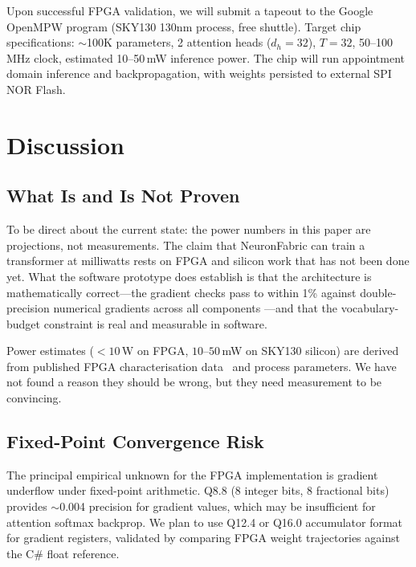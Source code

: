 \documentclass[11pt]{article}
\begin{document}
Upon successful FPGA validation, we will submit a tapeout to the Google OpenMPW
program (SKY130 130nm process, free shuttle). Target chip specifications:
$\sim$100K parameters, 2 attention heads ($d_h=32$), $T=32$, 50--100\,MHz clock,
estimated 10--50\,mW inference power. The chip will run appointment domain inference
and backpropagation, with weights persisted to external SPI NOR Flash.

\section{Discussion}

\subsection{What Is and Is Not Proven}

To be direct about the current state: the power numbers in this paper are projections,
not measurements. The claim that NeuronFabric can train a transformer at milliwatts
rests on FPGA and silicon work that has not been done yet. What the software prototype
does establish is that the architecture is mathematically correct---the gradient checks
pass to within 1\% against double-precision numerical gradients across all components
---and that the vocabulary-budget constraint is real and measurable in software.

Power estimates ($<10$\,W on FPGA, $10$--$50$\,mW on SKY130 silicon) are derived
from published FPGA characterisation data~\cite{xilinx_power} and process parameters.
We have not found a reason they should be wrong, but they need measurement to be
convincing.

\subsection{Fixed-Point Convergence Risk}

The principal empirical unknown for the FPGA implementation is gradient underflow
under fixed-point arithmetic. Q8.8 (8 integer bits, 8 fractional bits) provides
$\sim$0.004 precision for gradient values, which may be insufficient for attention
softmax backprop. We plan to use Q12.4 or Q16.0 accumulator format for gradient
registers, validated by comparing FPGA weight trajectories against the C\# float
reference.
\end{document}
